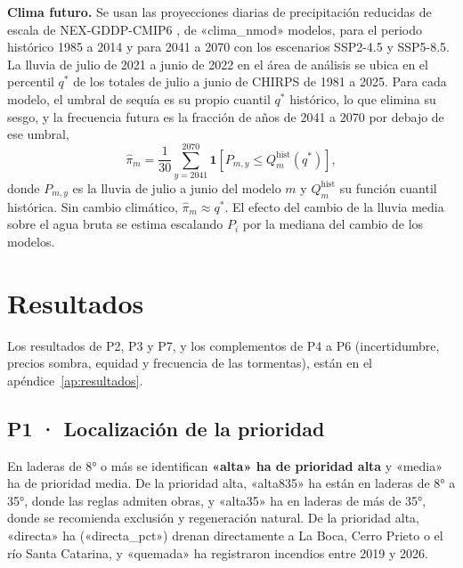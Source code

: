\textbf{Clima futuro.} Se usan las proyecciones diarias de precipitación reducidas de escala de NEX-GDDP-CMIP6 , de «clima_nmod» modelos, para el periodo histórico 1985 a 2014 y para 2041 a 2070 con los escenarios SSP2-4.5 y SSP5-8.5. La lluvia de julio de 2021 a junio de 2022 en el área de análisis se ubica en el percentil $q^\ast$ de los totales de julio a junio de CHIRPS de 1981 a 2025. Para cada modelo, el umbral de sequía es su propio cuantil $q^\ast$ histórico, lo que elimina su sesgo, y la frecuencia futura es la fracción de años de 2041 a 2070 por debajo de ese umbral,
\begin{equation}
\hat\pi_m=\frac{1}{30}\sum_{y=2041}^{2070}\mathbf 1\!\left[P_{m,y}\le Q_{m}^{\text{hist}}(q^\ast)\right],
\end{equation}
donde $P_{m,y}$ es la lluvia de julio a junio del modelo $m$ y $Q_{m}^{\text{hist}}$ su función cuantil histórica. Sin cambio climático, $\hat\pi_m\approx q^\ast$. El efecto del cambio de la lluvia media sobre el agua bruta se estima escalando $P_i$ por la mediana del cambio de los modelos.

\section{Resultados}

Los resultados de P2, P3 y P7, y los complementos de P4 a P6 (incertidumbre, precios sombra, equidad y frecuencia de las tormentas), están en el apéndice~\ref{ap:resultados}.

\subsection{P1 · Localización de la prioridad}\label{res:p1}

En laderas de 8° o más se identifican \textbf{«alta» ha de prioridad alta} y «media» ha de prioridad media. De la prioridad alta, «alta835» ha están en laderas de 8° a 35°, donde las reglas admiten obras, y «alta35» ha en laderas de más de 35°, donde se recomienda exclusión y regeneración natural. De la prioridad alta, «directa» ha («directa_pct») drenan directamente a La Boca, Cerro Prieto o el río Santa Catarina, y «quemada» ha registraron incendios entre 2019 y 2026.

